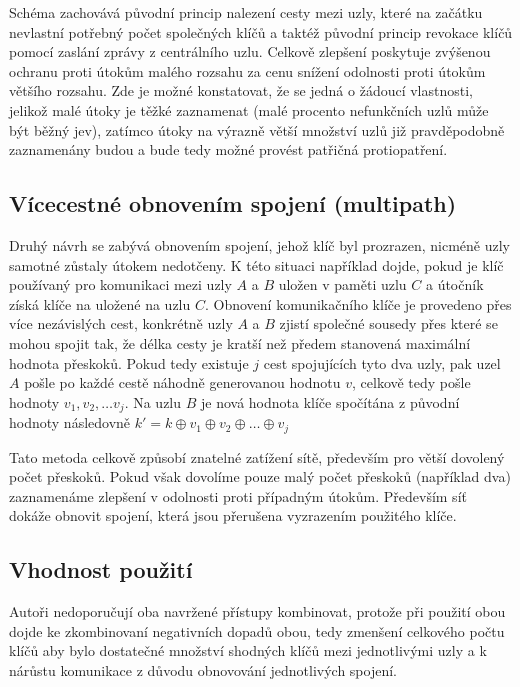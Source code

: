\documentclass[11pt,final,twoside]{fithesis2}
\begin{document}
Schéma zachovává původní princip nalezení cesty mezi uzly, které na začátku nevlastní potřebný počet společných klíčů a taktéž původní princip revokace klíčů pomocí zaslání zprávy z 
centrálního uzlu. Celkově zlepšení poskytuje zvýšenou ochranu proti útokům malého rozsahu za cenu snížení odolnosti proti útokům většího rozsahu. Zde je možné konstatovat, že se jedná 
o žádoucí vlastnosti, jelikož malé útoky je těžké zaznamenat (malé procento nefunkčních uzlů může být běžný jev), zatímco útoky na výrazně větší množství uzlů již pravděpodobně zaznamenány budou a 
bude tedy možné provést patřičná protiopatření. 

\subsection{Vícecestné obnovením spojení (multipath)}
Druhý návrh se zabývá obnovením spojení, jehož klíč byl prozrazen, nicméně uzly samotné zůstaly útokem nedotčeny. K této situaci například dojde, pokud je klíč používaný pro komunikaci mezi
uzly $A$ a $B$ uložen v paměti uzlu $C$ a útočník získá klíče na uložené na uzlu $C$. Obnovení komunikačního klíče je provedeno přes více nezávislých cest, konkrétně uzly $A$ a $B$ zjistí společné sousedy
přes které se mohou spojit tak, že délka cesty je kratší než předem stanovená maximální hodnota přeskoků. Pokud tedy existuje $j$ cest spojujících tyto dva uzly, pak uzel $A$ pošle po každé cestě náhodně 
generovanou hodnotu $v$, celkově tedy pošle hodnoty $v_1, v_2, \dots v_j$. Na uzlu $B$ je nová hodnota klíče spočítána z původní hodnoty následovně $k' = k \oplus v_1 \oplus v_2 \oplus \dots \oplus v_j$

Tato metoda celkově způsobí znatelné zatížení sítě, především pro větší dovolený počet přeskoků. Pokud však dovolíme pouze malý počet přeskoků (například dva) zaznamenáme zlepšení v odolnosti proti 
případným útokům. Především síť dokáže obnovit spojení, která jsou přerušena vyzrazením použitého klíče.

\subsection{Vhodnost použití}
Autoři nedoporučují oba navržené přístupy kombinovat, protože při použití obou dojde ke zkombinovaní negativních dopadů obou, tedy zmenšení celkového počtu klíčů aby bylo dostatečné množství shodných
klíčů mezi jednotlivými uzly a k nárůstu komunikace z důvodu obnovování jednotlivých spojení. 
\end{document}
